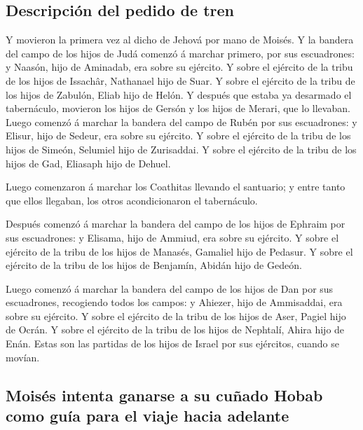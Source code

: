 \hypertarget{descripciuxf3n-del-pedido-de-tren}{%
\subsection{Descripción del pedido de
tren}\label{descripciuxf3n-del-pedido-de-tren}}

 Y movieron la primera vez al dicho de Jehová por mano de
Moisés.  Y la bandera del campo de los hijos de Judá
comenzó á marchar primero, por sus escuadrones: y Naasón, hijo de
Aminadab, era sobre su ejército.  Y sobre el ejército de la
tribu de los hijos de Issachâr, Nathanael hijo de Suar.  Y
sobre el ejército de la tribu de los hijos de Zabulón, Eliab hijo de
Helón.  Y después que estaba ya desarmado el tabernáculo,
movieron los hijos de Gersón y los hijos de Merari, que lo llevaban.
 Luego comenzó á marchar la bandera del campo de Rubén por
sus escuadrones: y Elisur, hijo de Sedeur, era sobre su ejército.
 Y sobre el ejército de la tribu de los hijos de Simeón,
Selumiel hijo de Zurisaddai.  Y sobre el ejército de la
tribu de los hijos de Gad, Eliasaph hijo de Dehuel.

 Luego comenzaron á marchar los Coathitas llevando el
santuario; y entre tanto que ellos llegaban, los otros acondicionaron el
tabernáculo.

 Después comenzó á marchar la bandera del campo de los
hijos de Ephraim por sus escuadrones: y Elisama, hijo de Ammiud, era
sobre su ejército.  Y sobre el ejército de la tribu de los
hijos de Manasés, Gamaliel hijo de Pedasur.  Y sobre el
ejército de la tribu de los hijos de Benjamín, Abidán hijo de Gedeón.

 Luego comenzó á marchar la bandera del campo de los hijos
de Dan por sus escuadrones, recogiendo todos los campos: y Ahiezer, hijo
de Ammisaddai, era sobre su ejército.  Y sobre el ejército
de la tribu de los hijos de Aser, Pagiel hijo de Ocrán.  Y
sobre el ejército de la tribu de los hijos de Nephtalí, Ahira hijo de
Enán.  Estas son las partidas de los hijos de Israel por
sus ejércitos, cuando se movían.

\hypertarget{moisuxe9s-intenta-ganarse-a-su-cuuxf1ado-hobab-como-guuxeda-para-el-viaje-hacia-adelante}{%
\subsection{Moisés intenta ganarse a su cuñado Hobab como guía para el
viaje hacia
adelante}\label{moisuxe9s-intenta-ganarse-a-su-cuuxf1ado-hobab-como-guuxeda-para-el-viaje-hacia-adelante}}

